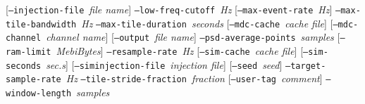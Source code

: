 \documentclass[10pt]{article}
\newcommand{\option}[1]{\texttt{#1}}
\newcommand{\parm}[1]{\textit{#1}}
\newenvironment{entry}%
{\begin{list}{}{\renewcommand{\makelabel}[1]%
{\parbox[b]{\labelwidth}{\makebox[0pt][l]{\textbf{##1}}\\}}%
\setlength{\labelwidth}{1em}%
\setlength{\labelsep}{1em}%
\setlength{\leftmargin}{2em}%
\setlength{\topsep}{\medskipamount}%
\setlength{\itemsep}{\medskipamount}%
\setlength{\parsep}{\medskipamount}%
\setlength{\listparindent}{0pt}}}
{\end{list}}
\begin{document}
\begin{entry}
[\option{--injection-file}~\parm{file name}] \newline \hspace*{0.5in}
\option{--low-freq-cutoff}~\parm{Hz} \newline \hspace*{0.5in}
[\option{--max-event-rate}~\parm{Hz}] \newline \hspace*{0.5in}
\option{--max-tile-bandwidth}~\parm{Hz} \newline \hspace*{0.5in}
\option{--max-tile-duration}~\parm{seconds} \newline \hspace*{0.5in}
[\option{--mdc-cache}~\parm{cache file}] \newline \hspace*{0.5in}
[\option{--mdc-channel}~\parm{channel name}] \newline \hspace*{0.5in}
[\option{--output}~\parm{file name}] \newline \hspace*{0.5in}
\option{--psd-average-points}~\parm{samples} \newline \hspace*{0.5in}
[\option{--ram-limit}~\parm{MebiBytes}] \newline \hspace*{0.5in}
\option{--resample-rate}~\parm{Hz} \newline \hspace*{0.5in}
[\option{--sim-cache}~\parm{cache file}] \newline \hspace*{0.5in}
[\option{--sim-seconds}~\parm{sec.s}] \newline \hspace*{0.5in}
[\option{--siminjection-file}~\parm{injection file}] \newline \hspace*{0.5in}
[\option{--seed}~\parm{seed}] \newline \hspace*{0.5in}
\option{--target-sample-rate}~\parm{Hz} \newline \hspace*{0.5in}
\option{--tile-stride-fraction}~\parm{fraction} \newline \hspace*{0.5in}
[\option{--user-tag}~\parm{comment}] \newline \hspace*{0.5in}
\option{--window-length}~\parm{samples} \newline \hspace*{0.5in}


\end{entry}
\end{document}
